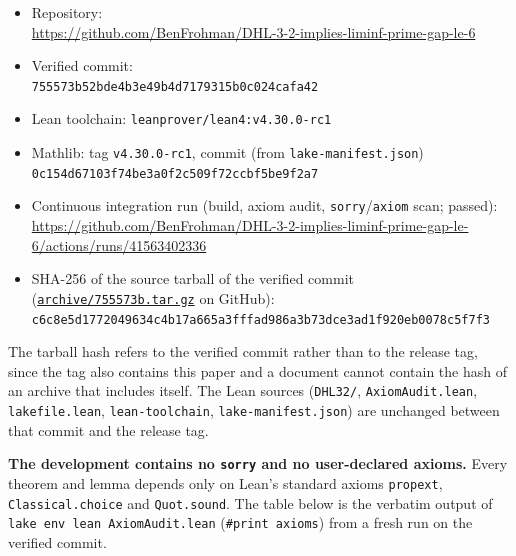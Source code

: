 \documentclass[11pt]{amsart}
\theoremstyle{plain}
\theoremstyle{definition}
\theoremstyle{remark}
\begin{document}
{\raggedright
\begin{itemize}
\item Repository:\\ {\footnotesize\url{https://github.com/BenFrohman/DHL-3-2-implies-liminf-prime-gap-le-6}}
\item Verified commit:\\ {\footnotesize\texttt{755573b52bde4b3e49b4d7179315b0c024cafa42}}
\item Lean toolchain: \texttt{leanprover/lean4:v4.30.0-rc1}
\item Mathlib: tag \texttt{v4.30.0-rc1}, commit (from \texttt{lake-manifest.json})\\ {\footnotesize\texttt{0c154d67103f74be3a0f2c509f72ccbf5be9f2a7}}
\item Continuous integration run (build, axiom audit, \texttt{sorry}/\texttt{axiom} scan; passed):\\ {\footnotesize\url{https://github.com/BenFrohman/DHL-3-2-implies-liminf-prime-gap-le-6/actions/runs/41563402336}}
\item SHA-256 of the source tarball of the verified commit
(\href{https://github.com/BenFrohman/DHL-3-2-implies-liminf-prime-gap-le-6/archive/755573b52bde4b3e49b4d7179315b0c024cafa42.tar.gz}{\texttt{archive/755573b.tar.gz}} on GitHub):\\
{\footnotesize\texttt{c6c8e5d1772049634c4b17a665a3fffad986a3b73dce3ad1f920eb0078c5f7f3}}
\end{itemize}\par}

The tarball hash refers to the verified commit rather than to the release tag, since the tag also contains this paper and a document cannot contain the hash of an archive that includes itself. The Lean sources (\texttt{DHL32/}, \texttt{AxiomAudit.lean}, \texttt{lakefile.lean}, \texttt{lean-toolchain}, \texttt{lake-manifest.json}) are unchanged between that commit and the release tag.

\textbf{The development contains no \texttt{sorry} and no user-declared axioms.} Every theorem and lemma depends only on Lean's standard axioms \texttt{propext}, \texttt{Classical.choice} and \texttt{Quot.sound}. The table below is the verbatim output of \texttt{lake env lean AxiomAudit.lean} (\texttt{\#print axioms}) from a fresh run on the verified commit.
\end{document}
